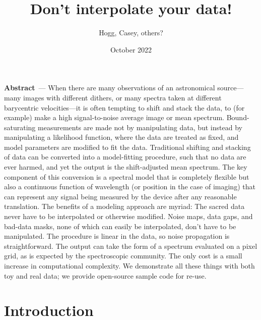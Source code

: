 \documentclass[11pt]{article}
\title{\bfseries%
Don't interpolate your data!}
\author{Hogg, Casey, others?}
\date{October 2022}
\renewcommand{\paragraph}[1]{\medskip\par\noindent\textbf{#1}~---}
\begin{document}
\maketitle

\paragraph{Abstract}
When there are many observations of an astronomical source---many images with different dithers, or many spectra taken at different barycentric velocities---it is often tempting to shift and stack the data, to (for example) make a high signal-to-noise average image or mean spectrum.
Bound-saturating measurements are made not by manipulating data, but instead by manipulating a likelihood function, where the data are treated as fixed, and model parameters are modified to fit the data.
Traditional shifting and stacking of data can be converted into a model-fitting procedure, such that no data are ever harmed, and yet the output is the shift-adjusted mean spectrum.
The key component of this conversion is a spectral model that is completely flexible but also a continuous function of wavelength (or position in the case of imaging) that can represent any signal being measured by the device after any reasonable translation.
The benefits of a modeling approach are myriad:
The sacred data never have to be interpolated or otherwise modified.
Noise maps, data gaps, and bad-data masks, none of which can easily be interpolated, don't have to be manipulated.
The procedure is linear in the data, so noise propagation is straightforward.
The output can take the form of a spectrum evaluated on a pixel grid, as is expected by the spectroscopic community.
The only cost is a small increase in computational complexity.
We demonstrate all these things with both toy and real data; we provide open-source sample code for re-use.

\section{Introduction}
\end{document}
